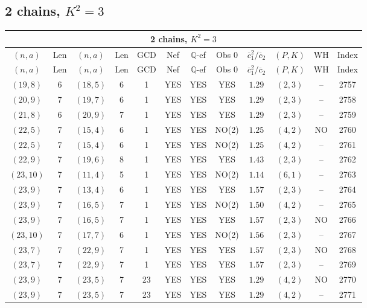 \subsection{2 chains, $K^2 = 3$}
\begin{longtable}{|c|c|c|c|c|c|c|c|c|c|c|c|}
\hline
\multicolumn{12}{|c|}{2 chains, $K^2 = 3$}\\
\hline
$(n,a)$ & Len & $(n,a)$ & Len & GCD & Nef & $\mathbb Q$-ef & Obs 0 & $\overline c_1^2 / \overline c_2$ & $(P,K)$ & WH & Index\\
\hline
\endfirsthead

\hline
$(n,a)$ & Len & $(n,a)$ & Len & GCD & Nef & $\mathbb Q$-ef & Obs 0 & $\overline c_1^2 / \overline c_2$ & $(P,K)$ & WH & Index\\
\hline
\endhead
\hline
\endfoot

$(19,8)$ & 6 & $(18,5)$ & 6 & 1 & YES & YES & YES & $1.29$ & $(2,3)$ & -- & 2757\\
$(20,9)$ & 7 & $(19,7)$ & 6 & 1 & YES & YES & YES & $1.29$ & $(2,3)$ & -- & 2758\\
$(21,8)$ & 6 & $(20,9)$ & 7 & 1 & YES & YES & YES & $1.29$ & $(2,3)$ & -- & 2759\\
$(22,5)$ & 7 & $(15,4)$ & 6 & 1 & YES & YES & NO(2) & $1.25$ & $(4,2)$ & NO & 2760\\
$(22,5)$ & 7 & $(15,4)$ & 6 & 1 & YES & YES & NO(2) & $1.25$ & $(4,2)$ & -- & 2761\\
$(22,9)$ & 7 & $(19,6)$ & 8 & 1 & YES & YES & YES & $1.43$ & $(2,3)$ & -- & 2762\\
$(23,10)$ & 7 & $(11,4)$ & 5 & 1 & YES & YES & NO(2) & $1.14$ & $(6,1)$ & -- & 2763\\
$(23,9)$ & 7 & $(13,4)$ & 6 & 1 & YES & YES & YES & $1.57$ & $(2,3)$ & -- & 2764\\
$(23,9)$ & 7 & $(16,5)$ & 7 & 1 & YES & YES & NO(2) & $1.50$ & $(4,2)$ & -- & 2765\\
$(23,9)$ & 7 & $(16,5)$ & 7 & 1 & YES & YES & YES & $1.57$ & $(2,3)$ & NO & 2766\\
$(23,10)$ & 7 & $(17,7)$ & 6 & 1 & YES & YES & NO(2) & $1.56$ & $(2,3)$ & -- & 2767\\
$(23,7)$ & 7 & $(22,9)$ & 7 & 1 & YES & YES & YES & $1.57$ & $(2,3)$ & NO & 2768\\
$(23,7)$ & 7 & $(22,9)$ & 7 & 1 & YES & YES & YES & $1.57$ & $(2,3)$ & -- & 2769\\
$(23,9)$ & 7 & $(23,5)$ & 7 & 23 & YES & YES & YES & $1.29$ & $(4,2)$ & NO & 2770\\
$(23,9)$ & 7 & $(23,5)$ & 7 & 23 & YES & YES & YES & $1.29$ & $(4,2)$ & -- & 2771\\

\end{longtable}
